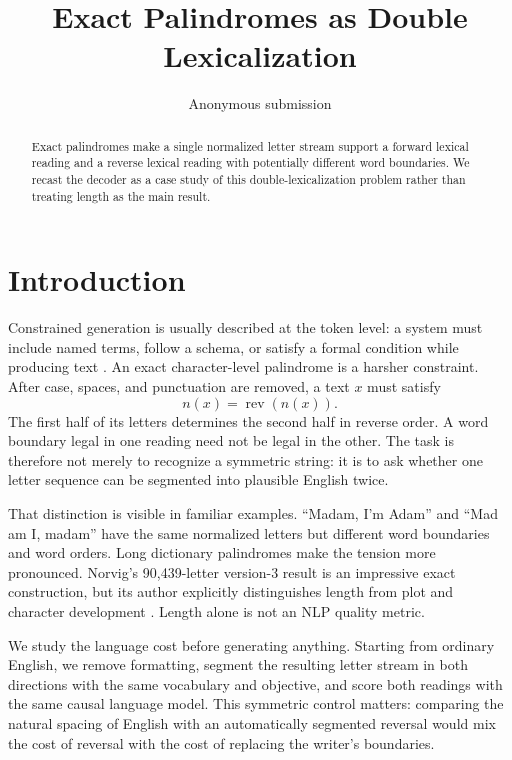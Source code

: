 \documentclass[11pt]{article}
\title{Exact Palindromes as Double Lexicalization}
\author{Anonymous submission}
\newcommand{\norm}[1]{n(#1)}
\newcommand{\rev}{\operatorname{rev}}
\begin{document}
\maketitle

\begin{abstract}
Exact palindromes make a single normalized letter stream support a forward lexical reading and a reverse lexical reading with potentially different word boundaries. We recast the decoder as a case study of this double-lexicalization problem rather than treating length as the main result.
\end{abstract}

\section{Introduction}

Constrained generation is usually described at the token level: a system must
include named terms, follow a schema, or satisfy a formal condition while
producing text \citep{hokamp2017grid,post2018fast,lu2022astar}. An exact
character-level palindrome is a harsher constraint. After case, spaces, and
punctuation are removed, a text $x$ must satisfy
\begin{equation}
  \norm{x}=\rev(\norm{x}).
\end{equation}
The first half of its letters determines the second half in reverse order. A
word boundary legal in one reading need not be legal in the other. The task is
therefore not merely to recognize a symmetric string: it is to ask whether one
letter sequence can be segmented into plausible English twice.

That distinction is visible in familiar examples. ``Madam, I'm Adam'' and
``Mad am I, madam'' have the same normalized letters but different word
boundaries and word orders. Long dictionary palindromes make the tension more
pronounced. Norvig's 90,439-letter version-3 result is an impressive exact
construction, but its author explicitly distinguishes length from plot and
character development \citep{norvig2016palindrome}. Length alone is not an
NLP quality metric.

We study the language cost before generating anything. Starting from ordinary
English, we remove formatting, segment the resulting letter stream in both
directions with the same vocabulary and objective, and score both readings
with the same causal language model. This symmetric control matters: comparing
the natural spacing of English with an automatically segmented reversal would
mix the cost of reversal with the cost of replacing the writer's boundaries.
\end{document}
